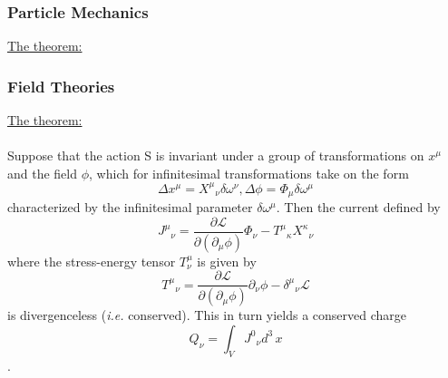 \documentclass[twocolumn]{article}
\begin{document}
\subsubsection{Particle Mechanics}

\underline{The theorem:}



\subsubsection{Field Theories}

\noindent \underline{The theorem:}\\ \\
Suppose that the action S is invariant under a group of 
transformations on 
$x^{\mu}$ and the field $\phi$, which for infinitesimal 
transformations take on the form
\[
  \Delta x^{\mu}= {X^{\mu}}_{\nu} \delta \omega^{\nu}, 
  \Delta \phi = {\Phi}_{\mu} \delta \omega^{\mu}
\]
characterized by the infinitesimal parameter $\delta \omega^{\mu}$.  
Then the current defined by
\[
  {J^{\mu}}_{\nu} = \frac{\partial \mathcal{L}}
                        {\partial ( \partial_{\mu} \phi)}
                   \Phi_{\nu} - 
				        {T^{\mu}}_{\kappa} {X^{\kappa}}_{\nu}
\]   
where the stress-energy tensor ${T^{\mu}_{\nu}}$ is given by
\[
  {T^{\mu}}_{\nu} = \frac{\partial \mathcal{L}}
                          {\partial ( \partial_{\mu} \phi)}
						  \partial_{\nu} \phi -
						  {\delta^{\mu}}_{\nu} \mathcal{L}
\]
is divergenceless (\emph{i.e.} conserved).  This in turn yields a 
conserved charge 
\[
  Q_{\nu} = \int_{V} {J^{0}}_{\nu} d^3 \,x 
\]   
\cite{ryder}.

%



\end{document}
